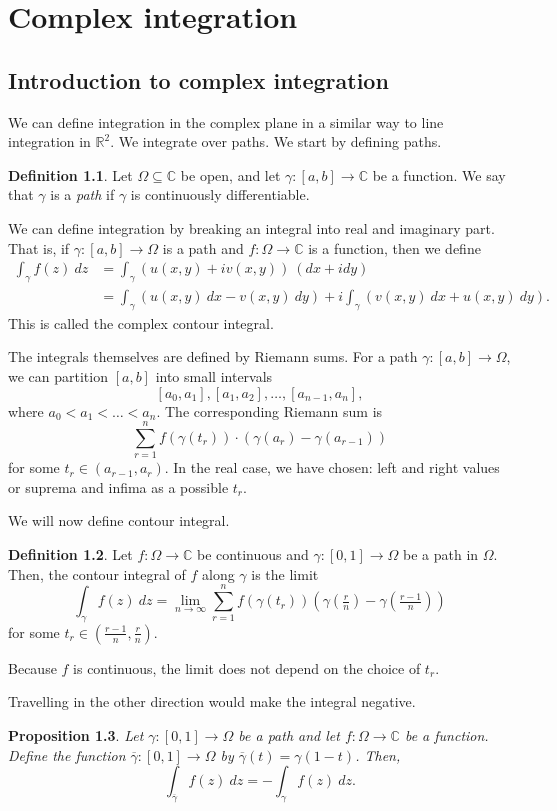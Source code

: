 \documentclass[a4paper, openany]{memoir}
\theoremstyle{definition}
\newtheorem{definition}{Definition}[section]
\theoremstyle{plain}
\newtheorem{proposition}[definition]{Proposition}
\begin{document}
\chapter{Complex integration}
\section{Introduction to complex integration}
We can define integration in the complex plane in a similar way to line integration in $\mathbb{R}^2$. We integrate over paths. We start by defining paths.
\begin{definition}
Let $\Omega \subseteq \mathbb{C}$ be open, and let $\gamma: [a, b] \to \mathbb{C}$ be a function. We say that $\gamma$ is a \emph{path} if $\gamma$ is continuously differentiable.
\end{definition}
\noindent We can define integration by breaking an integral into real and imaginary part. That is, if $\gamma: [a, b] \to \Omega$ is a path and $f: \Omega \to \mathbb{C}$ is a function, then we define
\begin{align*}
    \int_\gamma f(z) \ dz &= \int_\gamma (u(x, y) + iv(x, y)) \ (dx + idy) \\
    &= \int_\gamma (u(x, y) \ dx - v(x, y) \ dy) + i \int_\gamma (v(x, y) \ dx + u(x, y) \ dy).
\end{align*}
This is called the complex contour integral.

The integrals themselves are defined by Riemann sums. For a path $\gamma: [a, b] \to \Omega$, we can partition $[a, b]$ into small intervals
\[[a_0, a_1], [a_1, a_2], \dots, [a_{n-1}, a_n],\]
where $a_0 < a_1 < \dots < a_n$. The corresponding Riemann sum is
\[\sum_{r=1}^n f(\gamma(t_r)) \cdot (\gamma(a_r) - \gamma(a_{r-1}))\]
for some $t_r \in (a_{r-1}, a_r)$. In the real case, we have chosen: left and right values or suprema and infima as a possible $t_r$. 

We will now define contour integral.
\begin{definition}
Let $f: \Omega \to \mathbb{C}$ be continuous and $\gamma: [0, 1] \to \Omega$ be a path in $\Omega$. Then, the contour integral of $f$ along $\gamma$ is the limit
\[\int_\gamma f(z) \ dz = \lim_{n \to \infty} \sum_{r=1}^n f(\gamma(t_r)) (\gamma(\tfrac{r}{n}) - \gamma(\tfrac{r-1}{n}))\]
for some $t_r \in (\tfrac{r-1}{n}, \tfrac{r}{n})$.
\end{definition}
\noindent Because $f$ is continuous, the limit does not depend on the choice of $t_r$. 

Travelling in the other direction would make the integral negative.
\begin{proposition}
Let $\gamma: [0, 1] \to \Omega$ be a path and let $f: \Omega \to \mathbb{C}$ be a function. Define the function $\overline{\gamma}: [0, 1] \to \Omega$ by $\overline{\gamma}(t) = \gamma(1-t)$. Then,
\[\int_{\overline{\gamma}} f(z) \ dz = -\int_\gamma f(z) \ dz.\]
\end{proposition}
\end{document}
